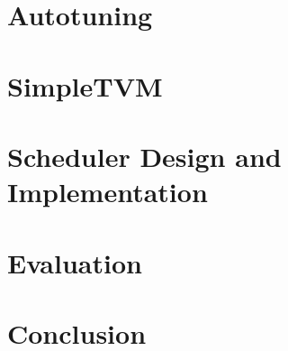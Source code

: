 	\chapter{Autotuning}
	
	\chapter{SimpleTVM}
	
	\chapter{Scheduler Design and Implementation}
	
	\chapter{Evaluation}
	
	\chapter{Conclusion}
	
	
	\clearpage
	
	
	\cleardoublepage
	\printbibliography

	\printglossary[style=altlist]
	
	\clearpage
	\appendix
